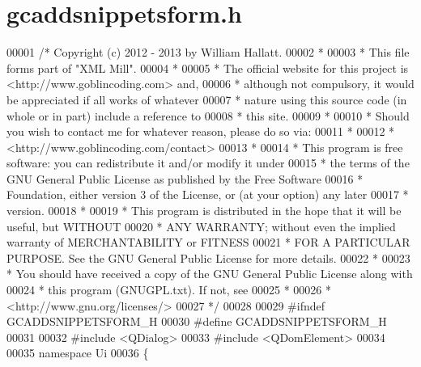 \hypertarget{gcaddsnippetsform_8h_source}{\section{gcaddsnippetsform.\-h}
}

\begin{DoxyCode}
00001 \textcolor{comment}{/* Copyright (c) 2012 - 2013 by William Hallatt.}
00002 \textcolor{comment}{ *}
00003 \textcolor{comment}{ * This file forms part of "XML Mill".}
00004 \textcolor{comment}{ *}
00005 \textcolor{comment}{ * The official website for this project is <http://www.goblincoding.com> and,}
00006 \textcolor{comment}{ * although not compulsory, it would be appreciated if all works of whatever}
00007 \textcolor{comment}{ * nature using this source code (in whole or in part) include a reference to}
00008 \textcolor{comment}{ * this site.}
00009 \textcolor{comment}{ *}
00010 \textcolor{comment}{ * Should you wish to contact me for whatever reason, please do so via:}
00011 \textcolor{comment}{ *}
00012 \textcolor{comment}{ *                 <http://www.goblincoding.com/contact>}
00013 \textcolor{comment}{ *}
00014 \textcolor{comment}{ * This program is free software: you can redistribute it and/or modify it
       under}
00015 \textcolor{comment}{ * the terms of the GNU General Public License as published by the Free
       Software}
00016 \textcolor{comment}{ * Foundation, either version 3 of the License, or (at your option) any later}
00017 \textcolor{comment}{ * version.}
00018 \textcolor{comment}{ *}
00019 \textcolor{comment}{ * This program is distributed in the hope that it will be useful, but WITHOUT}
00020 \textcolor{comment}{ * ANY WARRANTY; without even the implied warranty of MERCHANTABILITY or
       FITNESS}
00021 \textcolor{comment}{ * FOR A PARTICULAR PURPOSE.  See the GNU General Public License for more
       details.}
00022 \textcolor{comment}{ *}
00023 \textcolor{comment}{ * You should have received a copy of the GNU General Public License along with}
00024 \textcolor{comment}{ * this program (GNUGPL.txt).  If not, see}
00025 \textcolor{comment}{ *}
00026 \textcolor{comment}{ *                    <http://www.gnu.org/licenses/>}
00027 \textcolor{comment}{ */}
00028 
00029 \textcolor{preprocessor}{#ifndef GCADDSNIPPETSFORM\_H}
00030 \textcolor{preprocessor}{}\textcolor{preprocessor}{#define GCADDSNIPPETSFORM\_H}
00031 \textcolor{preprocessor}{}
00032 \textcolor{preprocessor}{#include <QDialog>}
00033 \textcolor{preprocessor}{#include <QDomElement>}
00034 
00035 \textcolor{keyword}{namespace }Ui
00036 \{

\end{DoxyCode}
